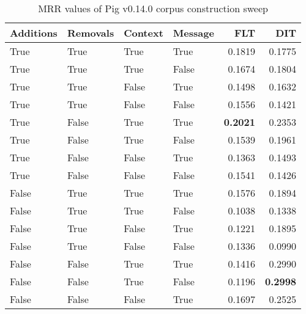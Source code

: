 
\begin{table}
\begin{spacing}{1.2}
\centering
\caption{MRR values of Pig v0.14.0 corpus construction sweep}
\label{table:pig_corpus_sweep}
\vspace{0.2em}
\begin{tabular}{llll|rr}
\toprule
Additions & Removals & Context & Message & FLT &       DIT \\
\midrule
     True &     True &    True &    True &           0.1819 &       0.1775 \\
     True &     True &    True &   False &           0.1674 &       0.1804 \\
     True &     True &   False &    True &           0.1498 &       0.1632 \\
     True &     True &   False &   False &           0.1556 &       0.1421 \\
     True &    False &    True &    True &     {\bf 0.2021} &       0.2353 \\
     True &    False &    True &   False &           0.1539 &       0.1961 \\
     True &    False &   False &    True &           0.1363 &       0.1493 \\
     True &    False &   False &   False &           0.1541 &       0.1426 \\
    False &     True &    True &    True &           0.1576 &       0.1894 \\
    False &     True &    True &   False &           0.1038 &       0.1338 \\
    False &     True &   False &    True &           0.1221 &       0.1895 \\
    False &     True &   False &   False &           0.1336 &       0.0990 \\
    False &    False &    True &    True &           0.1416 &       0.2990 \\
    False &    False &    True &   False &           0.1196 & {\bf 0.2998} \\
    False &    False &   False &    True &           0.1697 &       0.2525 \\
\bottomrule
\end{tabular}

\end{spacing}
\end{table}

